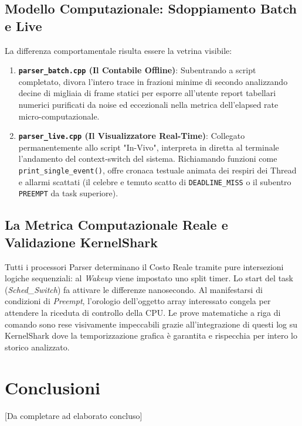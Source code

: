 \documentclass[a4paper,12pt]{report}
\begin{document}
\section{Modello Computazionale: Sdoppiamento Batch e Live}
La differenza comportamentale risulta essere la vetrina visibile:
\begin{enumerate}
    \item \textbf{\texttt{parser\_batch.cpp} (Il Contabile Offline)}: Subentrando a script completato, divora l'intero trace in frazioni minime di secondo analizzando decine di migliaia di frame statici per esporre all'utente report tabellari numerici purificati da noise ed eccezionali nella metrica dell'elapsed rate micro-computazionale.
    \item \textbf{\texttt{parser\_live.cpp} (Il Visualizzatore Real-Time)}: Collegato permanentemente allo script "In-Vivo", interpreta in diretta al terminale l'andamento del context-switch del sistema. Richiamando funzioni come \verb!print_single_event()!, offre cronaca testuale animata dei respiri dei Thread e allarmi scattati (il celebre e temuto scatto di \verb!DEADLINE_MISS! o il subentro \verb!PREEMPT! da task superiore). 
\end{enumerate}

\section{La Metrica Computazionale Reale e Validazione KernelShark}
Tutti i processori Parser determinano il Costo Reale tramite pure intersezioni logiche sequenziali: al \textit{Wakeup} viene impostato uno split timer. Lo start del task (\textit{Sched\_Switch}) fa attivare le differenze nanosecondo. Al manifestarsi di condizioni di \textit{Preempt}, l'orologio dell'oggetto array interessato congela per attendere la riceduta di controllo della CPU. 
Le prove matematiche a riga di comando sono rese visivamente impeccabili grazie all'integrazione di questi log su KernelShark dove la temporizzazione grafica è garantita e rispecchia per intero lo storico analizzato.

\chapter{Conclusioni}
[Da completare ad elaborato concluso]
\end{document}
